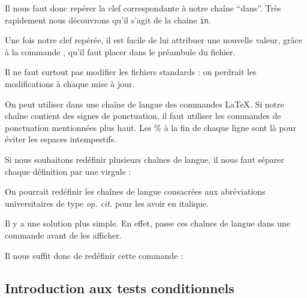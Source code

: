     Il nous faut donc repérer la clef correspondante à notre chaîne \enquote{dans}. Très rapidement nous découvrons qu'il s'agit de la chaine \verb|in|.
    
    Une fois  notre clef repérée, il est facile de lui attribuer une nouvelle valeur, grâce à la commande , qu'il faut placer dans le préambule du fichier.
    
    \begin{attention}
    Il ne faut surtout pas modifier les fichiers standards : on perdrait les modifications à chaque mise à jour.
    \end{attention}
    
    \begin{latexcode}
    \end{latexcode}

    
    On peut utiliser dans une chaîne de langue des commandes \LaTeX. Si notre chaîne contient des signes de ponctuation, il faut utiliser les commandes de ponctuation mentionnées plus haut. Les \% à la fin de chaque ligne sont là pour éviter les espaces intempestifs.
    
    Si nous souhaitons redéfinir plusieurs chaînes de langue, il nous faut séparer chaque définition par une virgule :
    
    \begin{latexcode}
    \end{latexcode}


\begin{plusloins}
On pourrait redéfinir les chaînes de langue consacrées aux abréviations universitaires de type \emph{op. cit.} pour les avoir en italique. 

Il y a une solution plus simple\label{mkibid}. En effet,  passe ces chaînes de langue dans une commande  avant de les afficher.

Il nous suffit donc de redéfinir cette commande :

\begin{latexcode}
\renewcommand{\mkibid}[1]{\emph{#1}}
\end{latexcode}

\end{plusloins}

\subsection{Introduction aux tests conditionnels}\label{opcit}

